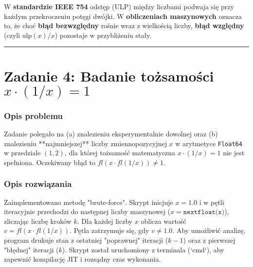 \documentclass[11pt, a4paper]{article}
\newcommand{\taskseparator}{\leavevmode\leaders\hrule height 0.5pt\hfill\kern0pt}
\begin{document}
W \textbf{standardzie IEEE 754} odstęp (ULP) między liczbami podwaja się przy każdym przekroczeniu potęgi dwójki. W \textbf{obliczeniach maszynowych} oznacza to, że choć \textbf{błąd bezwzględny} rośnie wraz z wielkością liczby, \textbf{błąd względny} (czyli $\text{ulp}(x) / x$) pozostaje w przybliżeniu stały.

\taskseparator

\section{Zadanie 4: Badanie tożsamości \texorpdfstring{$x \cdot (1/x) = 1$}{x * (1/x) = 1}}

\subsubsection{Opis problemu}
Zadanie polegało na (a) znalezieniu eksperymentalnie dowolnej oraz (b) znalezieniu **najmniejszej** liczby zmiennopozycyjnej $x$ w arytmetyce \texttt{Float64} w przedziale $(1, 2)$, dla której tożsamość matematyczna $x \cdot (1/x) = 1$ nie jest spełniona. Oczekiwany błąd to $fl(x \cdot fl(1/x)) \neq 1$.

\subsubsection{Opis rozwiązania}
Zaimplementowano metodę "brute-force". Skrypt inicjuje $x = 1.0$ i w pętli iteracyjnie przechodzi do następnej liczby maszynowej ($x = \texttt{nextfloat(x)}$), zliczając liczbę kroków $k$. Dla każdej liczby $x$ oblicza wartość $v = fl(x \cdot fl(1/x))$. Pętla zatrzymuje się, gdy $v \neq 1.0$. Aby umożliwić analizę, program drukuje stan z ostatniej "poprawnej" iteracji ($k-1$) oraz z pierwszej "błędnej" iteracji ($k$). Skrypt został uruchomiony z terminala (`cmd`), aby zapewnić kompilację JIT i rozsądny czas wykonania.
\end{document}
